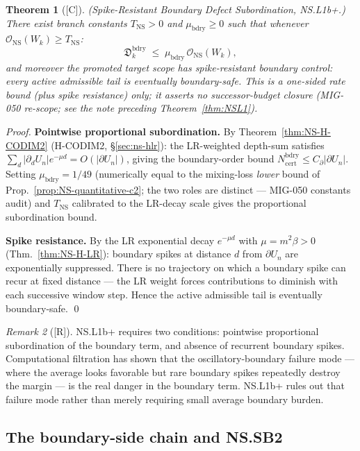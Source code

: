 \documentclass[12pt,oneside]{amsbook}
\theoremstyle{plain}
\newtheorem{theorem}{Theorem}[section]
\theoremstyle{definition}
\theoremstyle{remark}
\newtheorem{remark}[theorem]{Remark}
\newcommand{\status}[1]{\textup{[#1]}}
\begin{document}
\begin{theorem}[\status{C}]\label{thm:NSL1b}
\textup{(Spike-Resistant Boundary Defect Subordination,
NS.L1b+.)} There exist branch constants $T_{\mathrm{NS}} > 0$
and $\mu_{\mathrm{bdry}} \geq 0$ such that whenever
$\mathcal{O}_{\mathrm{NS}}(W_k) \geq T_{\mathrm{NS}}$:
\[
 \mathfrak{D}_k^{\mathrm{bdry}}
 \;\leq\;
 \mu_{\mathrm{bdry}}\,\mathcal{O}_{\mathrm{NS}}(W_k),
\]
and moreover the promoted target scope has spike-resistant
boundary control: every active admissible tail is eventually
boundary-safe.
This is a one-sided rate bound (plus spike resistance) only; it
asserts no successor-budget closure (MIG-050 re-scope; see the note
preceding Theorem~\ref{thm:NSL1}).
\end{theorem}
\begin{proof}
\textbf{Pointwise proportional subordination.}
By Theorem~\ref{thm:NS-H-CODIM2} (H-CODIM2, §\ref{sec:ns-hlr}):
the LR-weighted depth-sum satisfies $\sum_d |\partial_d U_n|
e^{-\mu d} = O(|\partial U_n|)$, giving the boundary-order bound
$N_{\mathrm{cert}}^{\mathrm{bdry}} \leq C_\partial |\partial U_n|$.
Setting $\mu_{\mathrm{bdry}} = 1/49$ (numerically equal to the
mixing-loss \emph{lower} bound of
Prop.~\ref{prop:NS-quantitative-c2}; the two roles are distinct ---
MIG-050 constants audit) and $T_{\mathrm{NS}}$ calibrated to the LR-decay scale gives the
proportional subordination bound.

\textbf{Spike resistance.}
By the LR exponential decay $e^{-\mu d}$ with $\mu = m^2\beta > 0$
(Thm.~\ref{thm:NS-H-LR}): boundary spikes at distance $d$ from
$\partial U_n$ are exponentially suppressed. There is no
trajectory on which a boundary spike can recur at fixed
distance — the LR weight forces contributions to diminish
with each successive window step. Hence the active admissible
tail is eventually boundary-safe. \qed
\end{proof}


\begin{remark}[\status{R}]
NS.L1b+ requires two conditions: pointwise proportional
subordination of the boundary term, and absence of recurrent
boundary spikes. Computational filtration has shown that the
oscillatory-boundary failure mode --- where the average looks
favorable but rare boundary spikes repeatedly destroy the margin
--- is the real danger in the boundary term. NS.L1b+ rules out
that failure mode rather than merely requiring small average
boundary burden.
\end{remark}

\subsection{The boundary-side chain and NS.SB2}
\end{document}
